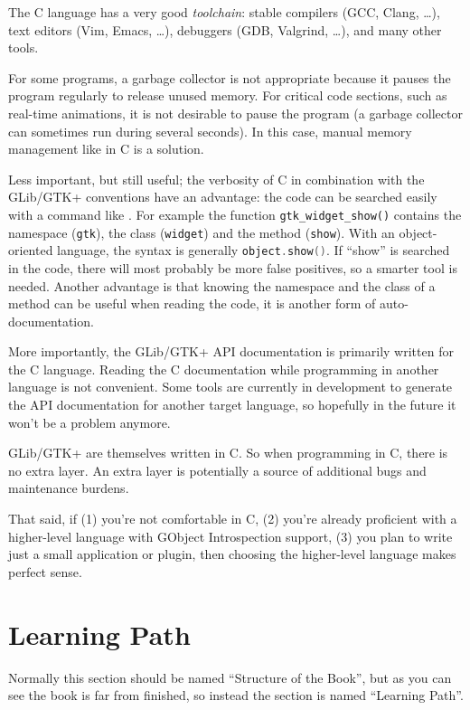 The C language has a very good \emph{toolchain}: stable compilers (GCC, Clang, …), text editors (Vim, Emacs, …), debuggers (GDB, Valgrind, …), and many other tools.

For some programs, a garbage collector is not appropriate because it pauses the program regularly to release unused memory. For critical code sections, such as real-time animations, it is not desirable to pause the program (a garbage collector can sometimes run during several seconds). In this case, manual memory management like in C is a solution.

Less important, but still useful; the verbosity of C in combination with the GLib/GTK+ conventions have an advantage: the code can be searched easily with a command like . For example the function \lstinline{gtk_widget_show()} contains the namespace (\lstinline{gtk}), the class (\lstinline{widget}) and the method (\lstinline{show}). With an object-oriented language, the syntax is generally \lstinline[language=C++]{object.show()}. If ``show'' is searched in the code, there will most probably be more false positives, so a smarter tool is needed. Another advantage is that knowing the namespace and the class of a method can be useful when reading the code, it is another form of auto-documentation.

More importantly, the GLib/GTK+ API documentation is primarily written for the C language. Reading the C documentation while programming in another language is not convenient. Some tools are currently in development to generate the API documentation for another target language, so hopefully in the future it won't be a problem anymore.

GLib/GTK+ are themselves written in C. So when programming in C, there is no extra layer. An extra layer is potentially a source of additional bugs and maintenance burdens.

That said, if (1) you're not comfortable in C, (2) you're already proficient with a higher-level language with GObject Introspection support, (3) you plan to write just a small application or plugin, then choosing the higher-level language makes perfect sense.

\section{Learning Path}
\label{intro-learning-path}
Normally this section should be named ``Structure of the Book'', but as you can see the book is far from finished, so instead the section is named ``Learning Path''.

